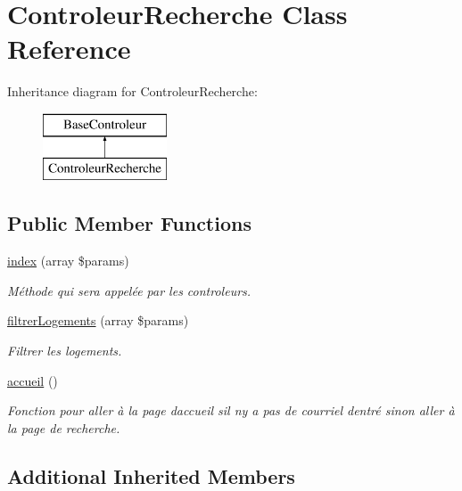 \hypertarget{class_controleur_recherche}{}\section{Controleur\+Recherche Class Reference}
\label{class_controleur_recherche}
Inheritance diagram for Controleur\+Recherche\+:\begin{figure}[H]
\begin{center}
\leavevmode
\includegraphics[height=2.000000cm]{class_controleur_recherche}
\end{center}
\end{figure}
\subsection*{Public Member Functions}
\begin{DoxyCompactItemize}
\item 
\hyperlink{class_controleur_recherche_a1744ef8ed9e924c25f247a5699c4cd99}{index} (array \$params)
\begin{DoxyCompactList}\small\item\em Méthode qui sera appelée par les controleurs. \end{DoxyCompactList}\item 
\hyperlink{class_controleur_recherche_ad07ebc9827fffe54b425336b350ee038}{filtrer\+Logements} (array \$params)
\begin{DoxyCompactList}\small\item\em Filtrer les logements. \end{DoxyCompactList}\item 
\hyperlink{class_controleur_recherche_a52e53a8e2a5fb1a427026efaf7ca10e8}{accueil} ()
\begin{DoxyCompactList}\small\item\em Fonction pour aller à la page d\textquotesingle{}accueil s\textquotesingle{}il n\textquotesingle{}y a pas de courriel d\textquotesingle{}entré sinon aller à la page de recherche. \end{DoxyCompactList}\end{DoxyCompactItemize}
\subsection*{Additional Inherited Members}



